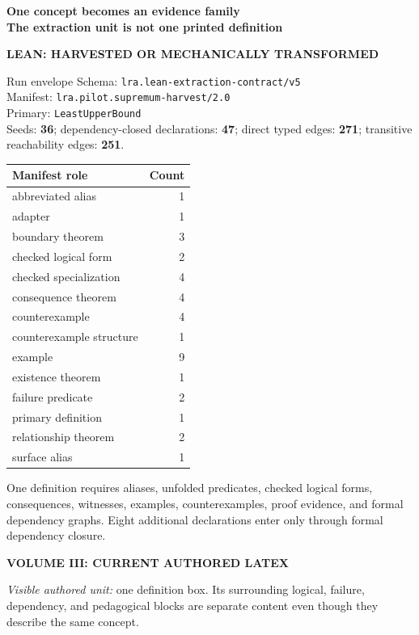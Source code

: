 \documentclass[10pt]{article}
\newcommand{\PageTitle}[2]{\begin{center}\sffamily\Large\bfseries #1\\[-1pt]\small\mdseries #2\end{center}\vspace{-4pt}}
\newcommand{\Columns}[2]{\begin{minipage}[t]{.488\textwidth}#1\end{minipage}\hfill\vrule\hfill\begin{minipage}[t]{.488\textwidth}#2\end{minipage}}
\newcommand{\LeanHead}{\color{leanblue}\sffamily\bfseries LEAN: HARVESTED OR MECHANICALLY TRANSFORMED\par\color{ink}}
\newcommand{\VolHead}{\color{volorange}\sffamily\bfseries VOLUME III: CURRENT AUTHORED LATEX\par\color{ink}}
\begin{document}
\PageTitle{One concept becomes an evidence family}{The extraction unit is not one printed definition}
\Columns{
\LeanHead
\begin{leanbox}{Run envelope}
Schema: \texttt{lra.lean-extraction-contract/v5}\\
Manifest: \texttt{lra.pilot.supremum-harvest/2.0}\\
Primary: \texttt{LeastUpperBound}\\
Seeds: \textbf{36}; dependency-closed declarations: \textbf{47}; direct typed edges: \textbf{271}; transitive reachability edges: \textbf{251}.
\end{leanbox}
\small
\begin{tabular}{@{}p{.79\linewidth}r@{}}
\toprule Manifest role & Count\\\midrule
abbreviated alias & 1 \\
adapter & 1 \\
boundary theorem & 3 \\
checked logical form & 2 \\
checked specialization & 4 \\
consequence theorem & 4 \\
counterexample & 4 \\
counterexample structure & 1 \\
example & 9 \\
existence theorem & 1 \\
failure predicate & 2 \\
primary definition & 1 \\
relationship theorem & 2 \\
surface alias & 1 \\
\bottomrule
\end{tabular}
\par\medskip
One definition requires aliases, unfolded predicates, checked logical forms,
consequences, witnesses, examples, counterexamples, proof evidence, and formal
dependency graphs. Eight additional declarations enter only through formal
dependency closure.
}{
\VolHead

\smallskip
\textit{Visible authored unit:} one definition box. Its surrounding logical,
failure, dependency, and pedagogical blocks are separate content even though
they describe the same concept.
}
\newpage
\end{document}
